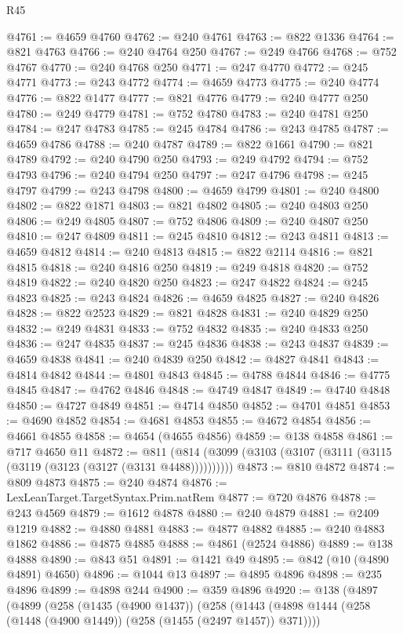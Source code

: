 \begin{lexlean}{R45}
\begin{coremodule}
{@4761 := @4659 @4760
@4762 := @240 @4761
@4763 := @822 @1336
@4764 := @821 @4763
@4766 := @240 @4764 @250
@4767 := @249 @4766
@4768 := @752 @4767
@4770 := @240 @4768 @250
@4771 := @247 @4770
@4772 := @245 @4771
@4773 := @243 @4772
@4774 := @4659 @4773
@4775 := @240 @4774
@4776 := @822 @1477
@4777 := @821 @4776
@4779 := @240 @4777 @250
@4780 := @249 @4779
@4781 := @752 @4780
@4783 := @240 @4781 @250
@4784 := @247 @4783
@4785 := @245 @4784
@4786 := @243 @4785
@4787 := @4659 @4786
@4788 := @240 @4787
@4789 := @822 @1661
@4790 := @821 @4789
@4792 := @240 @4790 @250
@4793 := @249 @4792
@4794 := @752 @4793
@4796 := @240 @4794 @250
@4797 := @247 @4796
@4798 := @245 @4797
@4799 := @243 @4798
@4800 := @4659 @4799
@4801 := @240 @4800
@4802 := @822 @1871
@4803 := @821 @4802
@4805 := @240 @4803 @250
@4806 := @249 @4805
@4807 := @752 @4806
@4809 := @240 @4807 @250
@4810 := @247 @4809
@4811 := @245 @4810
@4812 := @243 @4811
@4813 := @4659 @4812
@4814 := @240 @4813
@4815 := @822 @2114
@4816 := @821 @4815
@4818 := @240 @4816 @250
@4819 := @249 @4818
@4820 := @752 @4819
@4822 := @240 @4820 @250
@4823 := @247 @4822
@4824 := @245 @4823
@4825 := @243 @4824
@4826 := @4659 @4825
@4827 := @240 @4826
@4828 := @822 @2523
@4829 := @821 @4828
@4831 := @240 @4829 @250
@4832 := @249 @4831
@4833 := @752 @4832
@4835 := @240 @4833 @250
@4836 := @247 @4835
@4837 := @245 @4836
@4838 := @243 @4837
@4839 := @4659 @4838
@4841 := @240 @4839 @250
@4842 := @4827 @4841
@4843 := @4814 @4842
@4844 := @4801 @4843
@4845 := @4788 @4844
@4846 := @4775 @4845
@4847 := @4762 @4846
@4848 := @4749 @4847
@4849 := @4740 @4848
@4850 := @4727 @4849
@4851 := @4714 @4850
@4852 := @4701 @4851
@4853 := @4690 @4852
@4854 := @4681 @4853
@4855 := @4672 @4854
@4856 := @4661 @4855
@4858 := @4654 (@4655 @4856)
@4859 := @138 @4858
@4861 := @717 @4650 @11
@4872 := @811 (@814 (@3099 (@3103 (@3107 (@3111 (@3115 (@3119 (@3123 (@3127 (@3131 @4488))))))))))
@4873 := @810 @4872
@4874 := @809 @4873
@4875 := @240 @4874
@4876 := LexLeanTarget.TargetSyntax.Prim.natRem
@4877 := @720 @4876
@4878 := @243 @4569
@4879 := @1612 @4878
@4880 := @240 @4879
@4881 := @2409 @1219
@4882 := @4880 @4881
@4883 := @4877 @4882
@4885 := @240 @4883 @1862
@4886 := @4875 @4885
@4888 := @4861 (@2524 @4886)
@4889 := @138 @4888
@4890 := @843 @51
@4891 := @1421 @49
@4895 := @842 (@10 (@4890 @4891) @4650)
@4896 := @1044 @13
@4897 := @4895 @4896
@4898 := @235 @4896
@4899 := @4898 @244
@4900 := @359 @4896
@4920 := @138
    (@4897
      (@4899
        (@258
          (@1435 (@4900 @1437))
          (@258
            (@1443 (@4898 @1444 (@258 (@1448 (@4900 @1449)) (@258 (@1455 (@2497 @1457)) @371))))
}
\end{coremodule}
\end{lexlean}
